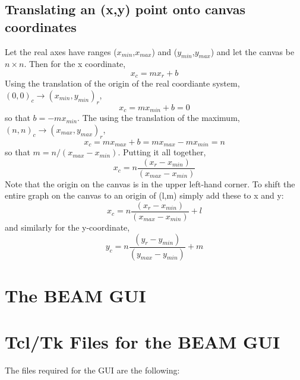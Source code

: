 \documentclass[12pt]{book}
\begin{document}
\subsection{Translating an (x,y) point onto canvas coordinates}

Let the real axes have ranges ($x_{min}$,$x_{max}$) and
($y_{min}$,$y_{max}$) and let the
canvas be $n\times n$.  Then for the x coordinate,
$$
x_c=mx_r+b
$$
Using the translation of the origin of the real coordiante system,
$(0,0)_c\rightarrow (x_{min},y_{min})_r$,
$$
x_c=m x_{min}+b=0
$$
so that $b=-m x_{min}$.  The using the translation of the maximum,
$(n,n)_c\rightarrow (x_{max},y_{max})_r$,
$$
x_c=m x_{max}+b=m x_{max}-m x_{min}=n
$$
so that $m=n/(x_{max}-x_{min})$.  Putting it all together,
$$
x_c=n\frac{(x_r-x_{min})}{(x_{max}-x_{min})}
$$
Note that the origin on the canvas is in the upper left-hand corner.
To shift the entire graph on the canvas to an origin of (l,m) simply add
these to x and y:
$$
x_c=n\frac{(x_r-x_{min})}{(x_{max}-x_{min})}+l
$$
and similarly for the y-coordinate,
$$
y_c=n\frac{(y_r-y_{min})}{(y_{max}-y_{min})}+m
$$

\section {The BEAM GUI}


\section{Tcl/Tk Files for the BEAM GUI}

The files required for the GUI are the following:
\end{document}
